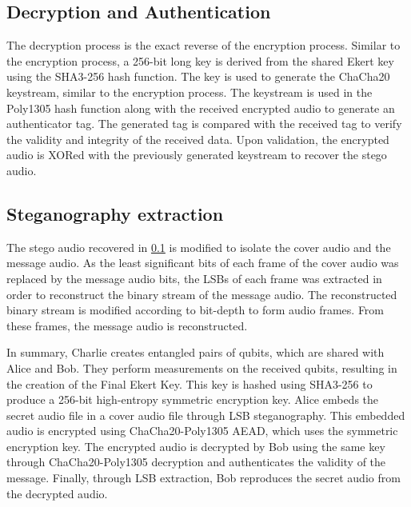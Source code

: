 \documentclass[a4paper]{cas-sc}
\begin{document}
\subsection{Decryption and Authentication}
\label{sec:chacha20poly1305decryption}
The decryption process is the exact reverse of the encryption process. Similar to the encryption process, a 256-bit long key is derived from the shared Ekert key using the SHA3-256 hash function. The key is used to generate the ChaCha20 keystream, similar to the encryption process. The keystream is used in the Poly1305 hash function along with the received encrypted audio to generate an authenticator tag. The generated tag is compared with the received tag to verify the validity and integrity of the received data. Upon validation, the encrypted audio is XORed with the previously generated keystream to recover the stego audio.
\subsection{Steganography extraction}
\label{sec:stegoExtract}
The stego audio recovered in \ref{sec:chacha20poly1305decryption} is modified to isolate the cover audio and the message audio. As the least significant bits of each frame of the cover audio was replaced by the message audio bits, the LSBs of each frame was extracted in order to reconstruct the binary stream of the message audio. The reconstructed binary stream is modified according to bit-depth to form audio frames. From these frames, the message audio is reconstructed.

In summary, Charlie creates entangled pairs of qubits, which are shared with Alice and Bob. They perform measurements on the received qubits, resulting in the creation of the Final Ekert Key. This key is hashed using SHA3-256 to produce a 256-bit high-entropy symmetric encryption key. Alice embeds the secret audio file in a cover audio file through LSB steganography. This embedded audio is encrypted using ChaCha20-Poly1305 AEAD, which uses the symmetric encryption key. The encrypted audio is decrypted by Bob using the same key through ChaCha20-Poly1305 decryption and authenticates the validity of the message. Finally, through LSB extraction, Bob reproduces the secret audio from the decrypted audio.
\end{document}
